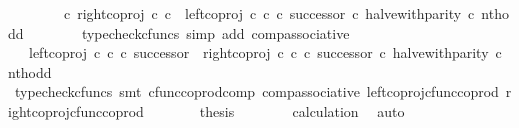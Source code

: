 \begin{isabellebody}
\ \ \ \ \ \ \ \ {\isasymcirc}\isactrlsub c\ right{\isacharunderscore}{\kern0pt}coproj\ {\isasymnat}\isactrlsub c\ {\isasymnat}\isactrlsub c\ {\isasymamalg}\ {\isacharparenleft}{\kern0pt}left{\isacharunderscore}{\kern0pt}coproj\ {\isasymnat}\isactrlsub c\ {\isasymnat}\isactrlsub c\ {\isasymcirc}\isactrlsub c\ successor{\isacharparenright}{\kern0pt}{\isacharparenright}{\kern0pt}\ {\isasymcirc}\isactrlsub c\ halve{\isacharunderscore}{\kern0pt}with{\isacharunderscore}{\kern0pt}parity\ {\isasymcirc}\isactrlsub c\ nth{\isacharunderscore}{\kern0pt}odd{\isachardoublequoteclose}\isanewline
\ \ \ \ \ \ \isamarkupfalse%
\ {\isacharparenleft}{\kern0pt}typecheck{\isacharunderscore}{\kern0pt}cfuncs{\isacharcomma}{\kern0pt}\ simp\ add{\isacharcolon}{\kern0pt}\ comp{\isacharunderscore}{\kern0pt}associative{}{\isacharparenright}{\kern0pt}\isanewline
\ \ \ \ \isamarkupfalse%
\ \isamarkupfalse%
\ {\isachardoublequoteopen}{\isachardot}{\kern0pt}{\isachardot}{\kern0pt}{\isachardot}{\kern0pt}\ {\isacharequal}{\kern0pt}\ {\isacharparenleft}{\kern0pt}{\isacharparenleft}{\kern0pt}left{\isacharunderscore}{\kern0pt}coproj\ {\isasymnat}\isactrlsub c\ {\isasymnat}\isactrlsub c\ {\isasymcirc}\isactrlsub c\ successor{\isacharparenright}{\kern0pt}\ {\isasymamalg}\ {\isacharparenleft}{\kern0pt}right{\isacharunderscore}{\kern0pt}coproj\ {\isasymnat}\isactrlsub c\ {\isasymnat}\isactrlsub c\ {\isasymcirc}\isactrlsub c\ successor{\isacharparenright}{\kern0pt}{\isacharparenright}{\kern0pt}\ {\isasymcirc}\isactrlsub c\ halve{\isacharunderscore}{\kern0pt}with{\isacharunderscore}{\kern0pt}parity\ {\isasymcirc}\isactrlsub c\ nth{\isacharunderscore}{\kern0pt}odd{\isachardoublequoteclose}\isanewline
\ \ \ \ \ \ \isamarkupfalse%
\ {\isacharparenleft}{\kern0pt}typecheck{\isacharunderscore}{\kern0pt}cfuncs{\isacharcomma}{\kern0pt}\ smt\ cfunc{\isacharunderscore}{\kern0pt}coprod{\isacharunderscore}{\kern0pt}comp\ comp{\isacharunderscore}{\kern0pt}associative{}\ left{\isacharunderscore}{\kern0pt}coproj{\isacharunderscore}{\kern0pt}cfunc{\isacharunderscore}{\kern0pt}coprod\ right{\isacharunderscore}{\kern0pt}coproj{\isacharunderscore}{\kern0pt}cfunc{\isacharunderscore}{\kern0pt}coprod{\isacharparenright}{\kern0pt}\isanewline
\ \ \ \ \isamarkupfalse%
\ \isamarkupfalse%
\ {\isacharquery}{\kern0pt}thesis\isanewline
\ \ \ \ \ \ \isamarkupfalse%
\ calculation\ \isamarkupfalse%
\ auto\isanewline
\ \ \isamarkupfalse%
\isanewline
\isanewline
\ \ \isamarkupfalse%

\end{isabellebody}
